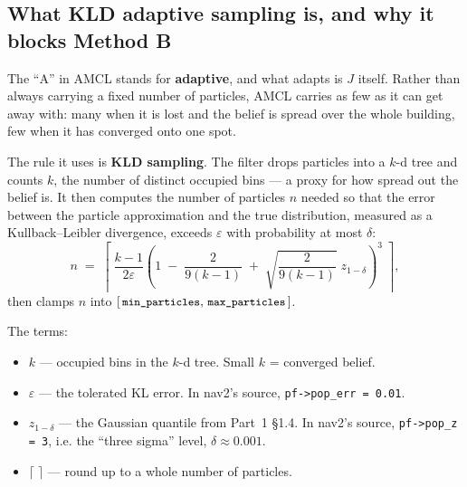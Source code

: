 \documentclass[11pt,a4paper]{report}
\newcommand{\term}[1]{\textcolor{rust}{\textbf{#1}}}
\newcommand{\file}[1]{\texttt{\small #1}}
\begin{document}
\subsection{What KLD adaptive sampling is, and why it blocks Method B}

The ``A'' in AMCL stands for \term{adaptive}, and what adapts is $J$ itself.
Rather than always carrying a fixed number of particles, AMCL carries as few
as it can get away with: many when it is lost and the belief is spread over the
whole building, few when it has converged onto one spot.

The rule it uses is \term{KLD sampling}. The filter drops particles into a
$k$-d tree and counts $k$, the number of distinct occupied bins --- a proxy
for how spread out the belief is. It then computes the number of particles $n$
needed so that the error between the particle approximation and the true
distribution, measured as a Kullback--Leibler divergence, exceeds $\varepsilon$
with probability at most $\delta$:
\begin{equation}
n \;=\; \left\lceil\;
\frac{k-1}{2\varepsilon}
\left(
1 \;-\; \frac{2}{9(k-1)} \;+\; \sqrt{\frac{2}{9(k-1)}}\; z_{1-\delta}
\right)^{\!3}
\;\right\rceil ,
\label{eq:kld}
\end{equation}
then clamps $n$ into $[\,\file{min\_particles},\, \file{max\_particles}\,]$.

The terms:
\begin{itemize}[leftmargin=1.4em,itemsep=2pt]
\item $k$ --- occupied bins in the $k$-d tree. Small $k$ = converged belief.
\item $\varepsilon$ --- the tolerated KL error. In nav2's source,
\file{pf->pop\_err = 0.01}.
\item $z_{1-\delta}$ --- the Gaussian quantile from Part~1 \S1.4. In nav2's
source, \file{pf->pop\_z = 3}, i.e. the ``three sigma'' level, $\delta \approx
0.001$.
\item $\lceil\;\rceil$ --- round up to a whole number of particles.
\end{itemize}
\end{document}
